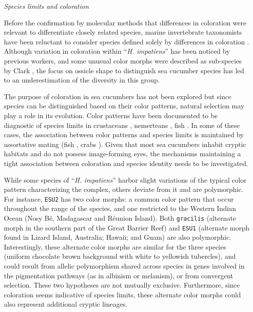 \documentclass[12pt,letterpaper]{article}\usepackage[]{graphicx}\usepackage[]{color}
\renewcommand{\subsection}[1]{%
\bigskip
\begin{center}
\begin{large}
\normalfont\itshape #1
\end{large}
\end{center}}
\begin{document}
\subsection{Species limits and coloration}

Before the confirmation by molecular methods that differences in coloration were
relevant to differentiate closely related species, marine invertebrate
taxonomists have been reluctant to consider species defined solely by
differences in coloration \citep{Knowlton1993}. Although variation in coloration
within ``\textit{H. impatiens}'' has been noticed by previous workers, and some
unusual color morphs were described as sub-species by Clark \citep{Clark1921,
  Clark1938}, the focus on ossicle shape to distinguish sea cucumber species has
led to an underestimation of the diversity in this group.

The purpose of coloration in sea cucumbers has not been explored but since
species can be distinguished based on their color patterns, natural selection
may play a role in its evolution. Color patterns have been documented to be
diagnostic of species limits in crustaceans \citep{Malay2010}, nemerteans
\citep{Knowlton1993}, fish \citep{McMillan1999}. In some of these cases, the
association between color patterns and species limits is maintained by assortative
mating (fish \citep{McMillan1999}, crabs \citep{Detto2007, Baldwin2012}). Given
that most sea cucumbers inhabit cryptic habitats and do not possess
image-forming eyes, the mechanisms maintaining a tight association between
coloration and species identity needs to be investigated.

While some species of ``\textit{H. impatiens}'' harbor slight variations of the
typical color pattern characterizing the complex, others deviate from it and are
polymorphic. For instance, \texttt{ESU2} has two color morphs: a common color
pattern that occur throughout the range of the species, and one restricted to
the Western Indian Ocean (Nosy B\'{e}, Madagascar and R\'{e}union Island). Both
\texttt{gracilis} (alternate morph in the southern part of the Great Barrier
Reef) and \texttt{ESU1} (alternate morph found in Lizard Island, Australia;
Hawaii; and Guam) are also polymorphic.  Interestingly, these alternate color
morphs are similar for the three species (uniform chocolate brown background
with white to yellowish tubercles), and could result from allelic polymorphism
shared across species in genes involved in the pigmentation pathways (as in
albinism or melanism), or from convergent selection. These two hypotheses are
not mutually exclusive. Furthermore, since coloration seems indicative of
species limits, these alternate color morphs could also represent additional
cryptic lineages.
\end{document}
